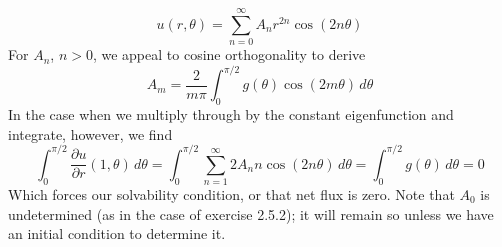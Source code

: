 \documentclass[a4paper]{article}
\begin{document}
\begin{enumerate}[label=(\alph*)]
	\[
		u \!\left( r,\theta \right) = \sum^{\infty}_{n=0} A_{n}r^{2n}\cos\!\left(2n \theta\right) 
	\]
	For \( A_{n} \), \( n > 0 \), we appeal to cosine orthogonality to derive
	\[
		A_{m} = \frac{2}{m \pi}\int^{\pi / 2}_{0} g \!\left( \theta \right)\cos\!\left(2m \theta\right) \, d \theta  
	\]
	In the case when we multiply through by the constant eigenfunction and integrate, however, we find
	\[
		\int^{\pi / 2}_{0} \frac{\partial u}{\partial r}\!\left( 1,\theta \right) \, d \theta = \int^{\pi / 2}_{0} \sum^{\infty}_{n=1} 2 A_{n}n \cos\!\left(2n \theta\right) \, d \theta = \int^{\pi / 2}_{0} g \!\left( \theta \right) \, d \theta = 0 
	\]
	Which forces our solvability condition, or that net flux is zero. Note that \( A_{0} \) is undetermined (as in the case of exercise 2.5.2); it will remain so unless we have an initial condition to determine it.
\end{enumerate}

\newpage

\end{document}
